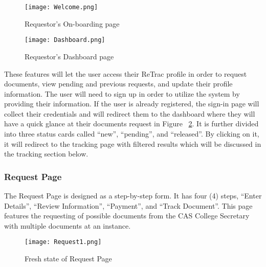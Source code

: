     \begin{figure}[h]
        \centering 
        \begin{minipage}[c]{0.5\linewidth}
            \centering
            \texttt{[image: Welcome.png]}
            \caption{Requestor's On-boarding page}
            \label{fig:Welcome}
        \end{minipage}
    \end{figure}

    \begin{figure}[h]
        \centering 
        \begin{minipage}[c]{0.5\linewidth}
            \centering
            \texttt{[image: Dashboard.png]}
            \caption{Requestor's Dashboard page}
            \label{fig:Dashboard}
        \end{minipage}
    \end{figure}


These features will let the user access their ReTrac profile in order to request documents, view pending and previous requests, and update their profile information. The user will need to sign up in order to utilize the system by providing their information. If the user is already registered, the sign-in page will collect their credentials and will redirect them to the dashboard where they will have a quick glance at their documents request in Figure ~\ref{fig:Dashboard}. It is further divided into three status cards called “new”, “pending”, and “released”. By clicking on it, it will redirect to the tracking page with filtered results which will be discussed in the tracking section below.

\subsubsection{Request Page}

The Request Page is designed as a step-by-step form. It has four (4) steps, “Enter Details”, “Review Information”, “Payment”, and “Track Document”. This page features the requesting of possible documents from the CAS College Secretary with multiple documents at an instance.

    \begin{figure}[h]
        \centering 
        \begin{minipage}[c]{0.5\linewidth}
            \centering
            \texttt{[image: Request1.png]}
            \caption{Fresh state of Request Page}
            \label{fig:Request1}
        \end{minipage}
    \end{figure}


